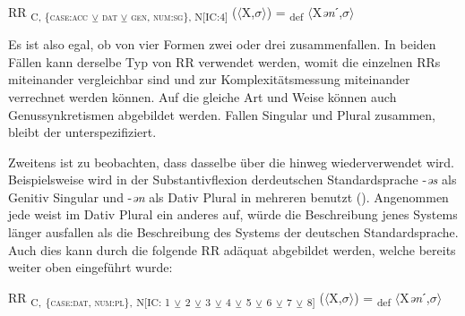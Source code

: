 \begin{exe}
\begin{exe}
\ea%
    \label{ex:key:35}
RR \textsubscript{C, \{\textsc{case:acc}} \textsubscript{${\veebar}$ \textsc{dat} ${\veebar}$ \textsc{gen}}\textsubscript{, \textsc{num:sg}\}, N[IC:4]} ($\langle$X,$\sigma$$\rangle$) = \textsubscript{def} $\langle$X\textit{ən}ˊ,$\sigma$$\rangle$
\z


Es ist also egal, ob von vier Formen zwei oder drei zusammenfallen. In beiden Fällen kann derselbe Typ von RR verwendet werden, womit die einzelnen RRs miteinander vergleichbar sind und zur Komplexitätsmessung miteinander verrechnet werden können. Auf die gleiche Art und Weise können auch Genussynkretismen abgebildet werden. Fallen Singular und Plural zusammen, bleibt der  unterspezifiziert.

Zweitens ist zu beobachten, dass dasselbe  über die  hinweg wiederverwendet wird. Beispielsweise wird in der Substantivflexion der\linebreak deutschen Standardsprache -\textit{əs} als Genitiv Singular und -\textit{ən} als Dativ Plural in mehreren  benutzt (). Angenommen jede  weist im Dativ Plural ein anderes  auf, würde die Beschreibung jenes Systems länger ausfallen als die Beschreibung des Systems der deutschen Standardsprache. Auch dies kann durch die folgende RR adäquat abgebildet werden, welche bereits weiter oben eingeführt wurde:

\begin{exe}%
RR \textsubscript{C,} \textsubscript{\{\textsc{case:dat}, \textsc{num:pl}\},} \textsubscript{N[IC: 1} \textsubscript{${\veebar}$}\textsubscript{ 2} \textsubscript{${\veebar}$}\textsubscript{ 3} \textsubscript{${\veebar}$}\textsubscript{ 4} \textsubscript{${\veebar}$}\textsubscript{ 5} \textsubscript{${\veebar}$}\textsubscript{ 6} \textsubscript{${\veebar}$}\textsubscript{ 7} \textsubscript{${\veebar}$}\textsubscript{ 8]} ($\langle$X,$\sigma$$\rangle$) = \textsubscript{def} $\langle$X\textit{ən}ˊ,$\sigma$$\rangle$
\end{exe}



\end{exe}
\end{exe}
